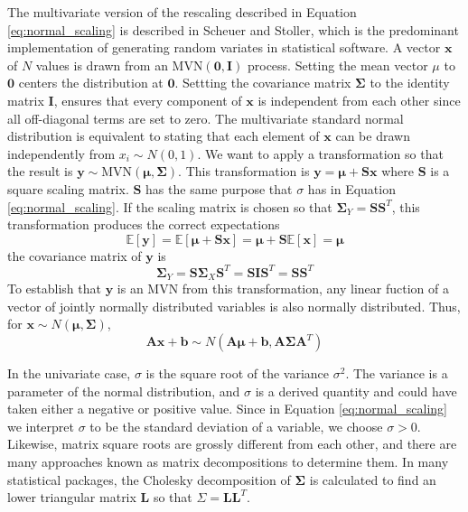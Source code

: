 The multivariate version of the rescaling described in Equation \ref{eq:normal_scaling} is described in Scheuer and Stoller\cite{scheuer1962_mvn_rv}, which is the predominant implementation of generating random variates in statistical software.  A vector $\bm{x}$ of $N$ values is drawn from an $\mathrm{MVN}(\bm{0},\bm{I})$ process.  Setting the mean vector $\mu$ to $\bm{0}$ centers the distribution at $\bm{0}$.
Settting the covariance matrix $\bm{\Sigma}$ to the identity matrix $\bm{I}$, ensures that every component of $\bm{x}$ is independent from each other since all off-diagonal terms are set to zero.  The multivariate standard normal distribution is equivalent to stating that each element of $\bm{x}$ can be drawn independently from $x_i \sim N(0,1)$.
We want to apply a transformation so that the result is $\bm{y} \sim \mathrm{MVN}(\bm{\mu},\bm{\Sigma})$.  This transformation is $\bm{y}=\bm{\mu} + \bm{S} \bm{x}$ where $\bm{S}$ is a square scaling matrix.  $\bm{S}$ has the same purpose that $\sigma$ has in Equation \ref{eq:normal_scaling}.
If the scaling matrix is chosen so that $\bm{\Sigma}_Y = \bm{S}\bm{S}^T$, this transformation produces the correct expectations
\begin{equation}
	  \mathbb{E}[\bm{y}]
		= \mathbb{E}\left[\bm{\mu} + \bm{S}\bm{x}\right]
		= \bm{\mu} + \bm{S} \mathbb{E}[\bm{x}]
		= \bm{\mu}
\end{equation}
the covariance matrix of $\bm{y}$ is
\begin{equation}
	\bm{\Sigma}_Y
	= \bm{S} \bm{\Sigma}_X \bm{S}^T
	= \bm{S} \bm{I} \bm{S}^T
	= \bm{S}\bm{S}^T
\end{equation}
To establish that $\bm{y}$ is an MVN from this transformation, any linear fuction of a vector of jointly normally distributed variables is also normally distributed\cite{greene2003}.  Thus, for $\bm{x} \sim N(\bm{\mu},\bm{\Sigma})$,
\begin{equation}
    \bm{A} \bm{x} + \bm{b}
		\sim N(\bm{A} \bm{\mu} + \bm{b},
		       \bm{A} \bm{\Sigma} \bm{A}^T)
\end{equation}

In the univariate case, $\sigma$ is the square root of the variance $\sigma^2$.  The variance is a parameter of the normal distribution, and $\sigma$ is a derived quantity and could have taken either a negative or positive value.  Since in Equation \ref{eq:normal_scaling} we interpret $\sigma$ to be the standard deviation of a variable, we choose $\sigma > 0$.  Likewise, matrix square roots are grossly different from each other, and there are many approaches known as matrix decompositions to determine them.  In many statistical packages, the Cholesky decomposition of $\bm{\Sigma}$ is calculated to find an lower triangular matrix $\bm{L}$ so that $\Sigma = \bm{L}\bm{L}^T$\cite{golub1996_matrices}.

